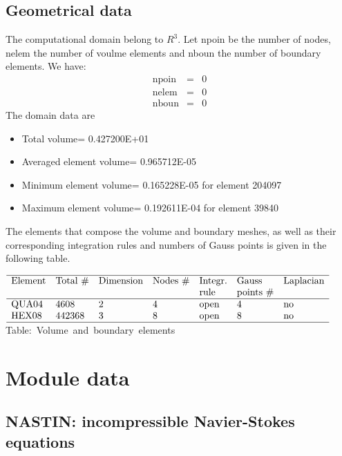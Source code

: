 \documentclass[10pt]{article}
\begin{document}
\subsection{Geometrical data}
The computational domain belong to
$R^3$.
Let npoin be the number of nodes, nelem the number
of voulme elements and nboun the number of boundary elements.
We have:
\begin{eqnarray*}
 \mbox{npoin} &=&        0 \\
 \mbox{nelem} &=&        0 \\
 \mbox{nboun} &=&        0
\end{eqnarray*}
The domain data are
\begin{itemize}
   \item Total volume= 0.427200E+01
   \item Averaged element volume= 0.965712E-05
   \item Minimum element volume= 0.165228E-05
         for element 204097
   \item Maximum element volume= 0.192611E-04
         for element 39840
\end{itemize}
The elements that compose the volume and boundary meshes, as well
as their corresponding integration rules and numbers of Gauss points
is given in the following table.
\begin{center}
\begin{math}
\begin{array}{lllllll}
\hline
\textrm{Element} & \textrm{Total \#}  & \textrm{Dimension} & \textrm{Nodes \#} & 
\textrm{Integr.} & \textrm{Gauss}     & \textrm{Laplacian} \\
\textrm{}        & \textrm{}          & \textrm{}          & \textrm{} & 
\textrm{rule}    & \textrm{points \#} & \textrm{} \\
\hline
\textrm{QUA04} &      4608 & 2 &  4 & \textrm{open} &  4 & \textrm{no}\\
\textrm{HEX08} &    442368 & 3 &  8 & \textrm{open} &  8 & \textrm{no}\\
\hline
\end{array}
\end{math}
\mbox{Table: Volume and boundary elements}
\end{center}
\section{Module data}
\subsection{NASTIN: incompressible Navier-Stokes equations}
\end{document}
